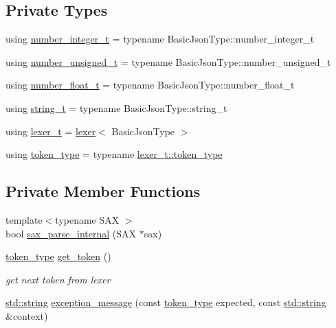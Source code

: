 \subsection*{Private Types}
\begin{DoxyCompactItemize}
\item 
using \hyperlink{classnlohmann_1_1detail_1_1parser_aa0362897269e0a7e50ae07be05f42d8e}{number\+\_\+integer\+\_\+t} = typename Basic\+Json\+Type\+::number\+\_\+integer\+\_\+t
\item 
using \hyperlink{classnlohmann_1_1detail_1_1parser_a3773ccef366c61da2e6a8c0eda36d0ec}{number\+\_\+unsigned\+\_\+t} = typename Basic\+Json\+Type\+::number\+\_\+unsigned\+\_\+t
\item 
using \hyperlink{classnlohmann_1_1detail_1_1parser_a8ca8e734da0632c2731fc3b9547dcf28}{number\+\_\+float\+\_\+t} = typename Basic\+Json\+Type\+::number\+\_\+float\+\_\+t
\item 
using \hyperlink{classnlohmann_1_1detail_1_1parser_af67b9b0405262c40be2b13adaab8b046}{string\+\_\+t} = typename Basic\+Json\+Type\+::string\+\_\+t
\item 
using \hyperlink{classnlohmann_1_1detail_1_1parser_a16030c5af158a94d1c799f82ff3a0147}{lexer\+\_\+t} = \hyperlink{classnlohmann_1_1detail_1_1lexer}{lexer}$<$ Basic\+Json\+Type $>$
\item 
using \hyperlink{classnlohmann_1_1detail_1_1parser_a21d247111b332785b7acf3f8e487d117}{token\+\_\+type} = typename \hyperlink{classnlohmann_1_1detail_1_1lexer_a3f313cdbe187cababfc5e06f0b69b098}{lexer\+\_\+t\+::token\+\_\+type}
\end{DoxyCompactItemize}
\subsection*{Private Member Functions}
\begin{DoxyCompactItemize}
\item 
{\footnotesize template$<$typename S\+AX $>$ }\\bool \hyperlink{classnlohmann_1_1detail_1_1parser_ad256ac6f45b213d29096a04b5aa3c587}{sax\+\_\+parse\+\_\+internal} (S\+AX $\ast$sax)
\item 
\hyperlink{classnlohmann_1_1detail_1_1parser_a21d247111b332785b7acf3f8e487d117}{token\+\_\+type} \hyperlink{classnlohmann_1_1detail_1_1parser_a33f3859d0dd402445b5859070fd24bab}{get\+\_\+token} ()
\begin{DoxyCompactList}\small\item\em get next token from lexer \end{DoxyCompactList}\item 
\hyperlink{namespacenlohmann_1_1detail_a1ed8fc6239da25abcaf681d30ace4985ab45cffe084dd3d20d928bee85e7b0f21}{std\+::string} \hyperlink{classnlohmann_1_1detail_1_1parser_a1328166d9e9b655399fdc890d47e4990}{exception\+\_\+message} (const \hyperlink{classnlohmann_1_1detail_1_1parser_a21d247111b332785b7acf3f8e487d117}{token\+\_\+type} expected, const \hyperlink{namespacenlohmann_1_1detail_a1ed8fc6239da25abcaf681d30ace4985ab45cffe084dd3d20d928bee85e7b0f21}{std\+::string} \&context)
\end{DoxyCompactItemize}
